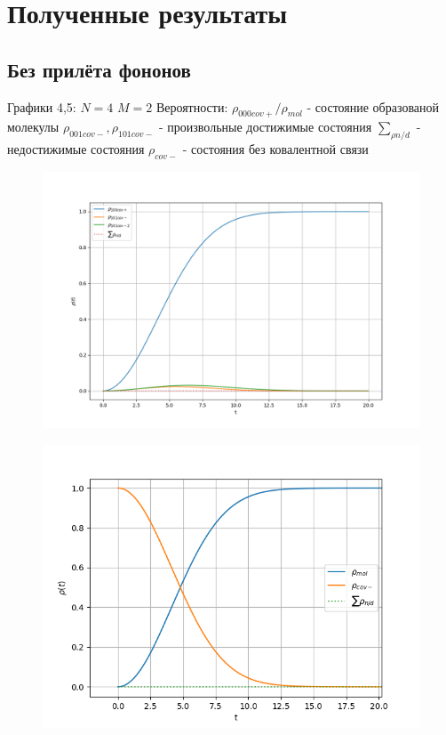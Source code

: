 \documentclass[12pt, a4paper]{article}
\begin{document}
\newpage
\section{Полученные результаты}
\subsection{Без прилёта фононов}
Графики 4,5:\newline
$N=4$\newline
$M=2$\newline
Вероятности:\newline
$\rho_{000cov+}/\rho_{mol}$ - состояние образованой молекулы\newline
$\rho_{001cov-},\rho_{101cov-}$ - произвольные достижимые состояния\newline
$\sum_{\rho n/d}$ - недостижимые состояния\newline
$\rho_{cov-}$ - состояния без ковалентной связи\newline
\begin{figure}[htp]
\centering
\includegraphics[scale=0.50]{Figure_1.png}
\caption{}
\label{}
\end{figure}
\begin{figure}[htp]
\centering
\includegraphics[scale=0.70]{Figure_3.png}
\caption{}
\label{}
\end{figure}
\newpage
\end{document}
